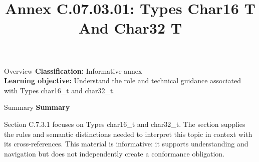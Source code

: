 \documentclass[10pt,letterpaper]{article}
\title{Annex C.07.03.01: Types Char16 T And Char32 T}
\author{}
\date{}
\begin{document}
\maketitle
\begin{CornellOverviewBox}{Overview}
\textbf{Classification:} Informative annex\\[2pt]
\textbf{Learning objective:} Understand the role and technical guidance associated with Types char16\_t and char32\_t.
\end{CornellOverviewBox}\begin{CornellSummaryBox}{Summary}
{\sffamily\bfseries\color{Accent} Summary}\par\vspace{3pt}Section C.7.3.1 focuses on Types char16\_t and char32\_t. The section supplies the rules and semantic distinctions needed to interpret this topic in context with its cross-references. This material is informative: it supports understanding and navigation but does not independently create a conformance obligation.
\end{CornellSummaryBox}
\end{document}
